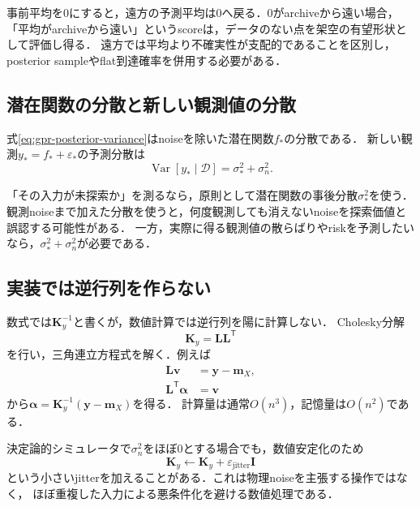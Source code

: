 \documentclass[a4paper,11pt]{ltjsarticle}
\newcommand{\D}{\mathcal D}
\newcommand{\I}{\bm I}
\newcommand{\T}{\mathsf T}
\newcommand{\Var}{\operatorname{Var}}
\begin{document}
\begin{cautionbox}
事前平均を0にすると，遠方の予測平均は0へ戻る．0がarchiveから遠い場合，
「平均がarchiveから遠い」というscoreは，データのない点を架空の有望形状として評価し得る．
遠方では平均より不確実性が支配的であることを区別し，posterior sampleやflat到達確率を併用する必要がある．
\end{cautionbox}

\subsection{潜在関数の分散と新しい観測値の分散}

式\eqref{eq:gpr-posterior-variance}はnoiseを除いた潜在関数\(f_*\)の分散である．
新しい観測\(y_*=f_*+\varepsilon_*\)の予測分散は
\begin{equation}
  \Var[y_*\mid\D]
  =\sigma_*^2+\sigma_n^2.
  \label{eq:observation-predictive-variance}
\end{equation}

\begin{applicationbox}
「その入力が未探索か」を測るなら，原則として潜在関数の事後分散\(\sigma_*^2\)を使う．
観測noiseまで加えた分散を使うと，何度観測しても消えないnoiseを探索価値と誤認する可能性がある．
一方，実際に得る観測値の散らばりやriskを予測したいなら，\(\sigma_*^2+\sigma_n^2\)が必要である．
\end{applicationbox}

\subsection{実装では逆行列を作らない}

数式では\(\bm K_y^{-1}\)と書くが，数値計算では逆行列を陽に計算しない．
Cholesky分解
\begin{equation}
  \bm K_y=\bm L\bm L^\T
\end{equation}
を行い，三角連立方程式を解く．例えば
\begin{align}
  \bm L\bm v&=\bm y-\bm m_X,\\
  \bm L^\T\bm\alpha&=\bm v
\end{align}
から\(\bm\alpha=\bm K_y^{-1}(\bm y-\bm m_X)\)を得る．
計算量は通常\(O(n^3)\)，記憶量は\(O(n^2)\)である．

決定論的シミュレータで\(\sigma_n^2\)をほぼ0とする場合でも，数値安定化のため
\begin{equation}
  \bm K_y\leftarrow\bm K_y+\varepsilon_{\mathrm{jitter}}\I
\end{equation}
という小さいjitterを加えることがある．これは物理noiseを主張する操作ではなく，
ほぼ重複した入力による悪条件化を避ける数値処理である．
\end{document}
